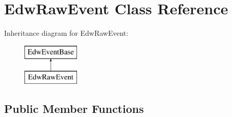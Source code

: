 \hypertarget{class_edw_raw_event}{
\section{EdwRawEvent Class Reference}
\label{class_edw_raw_event}
}
Inheritance diagram for EdwRawEvent:\begin{figure}[H]
\begin{center}
\leavevmode
\includegraphics[height=2cm]{class_edw_raw_event}
\end{center}
\end{figure}
\subsection*{Public Member Functions}
